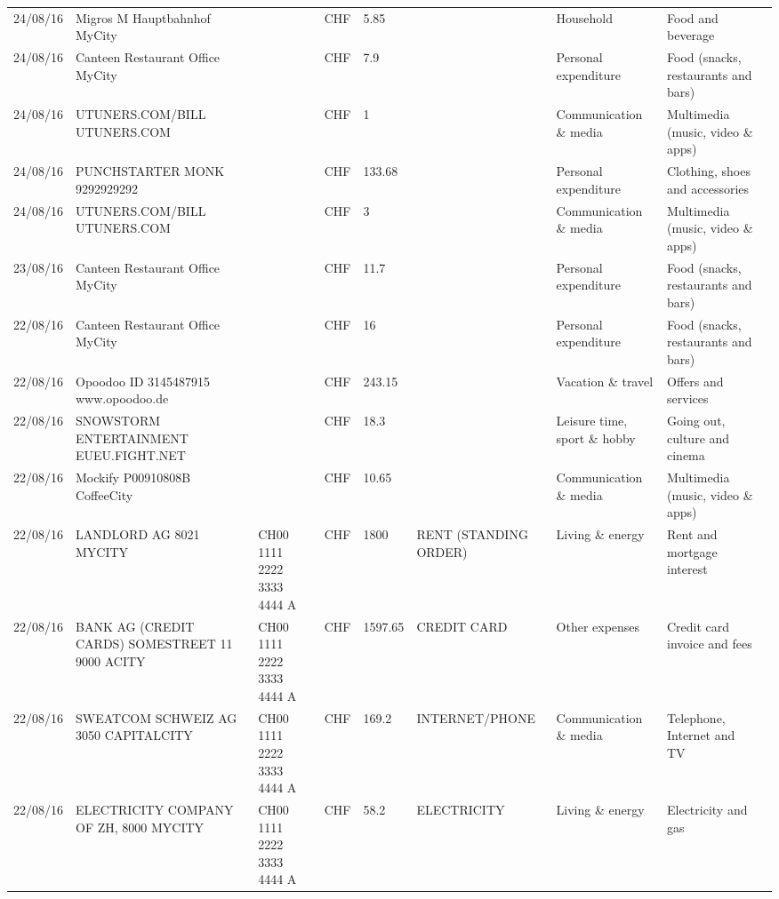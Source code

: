 \begin{landscape}
\begin{tiny}
\begin{longtable}{lp{4cm}llllp{3cm}ll}
		    24/08/16 & Migros M Hauptbahnhof    MyCity &       & CHF   & 5.85  &       & Household & Food and beverage \\
		    24/08/16 & Canteen Restaurant Office      MyCity &       & CHF   & 7.9   &       & Personal expenditure & Food (snacks, restaurants and bars) \\
		    24/08/16 & UTUNERS.COM/BILL          UTUNERS.COM &       & CHF   & 1     &       & Communication \& media & Multimedia (music, video \& apps) \\
		    24/08/16 & PUNCHSTARTER MONK   9292929292 &       & CHF   & 133.68 &       & Personal expenditure & Clothing, shoes and accessories \\
		    24/08/16 & UTUNERS.COM/BILL          UTUNERS.COM &       & CHF   & 3     &       & Communication \& media & Multimedia (music, video \& apps) \\
		    23/08/16 & Canteen Restaurant Office      MyCity &       & CHF   & 11.7  &       & Personal expenditure & Food (snacks, restaurants and bars) \\
		    22/08/16 & Canteen Restaurant Office      MyCity &       & CHF   & 16    &       & Personal expenditure & Food (snacks, restaurants and bars) \\
		    22/08/16 & Opoodoo ID 3145487915      www.opoodoo.de &       & CHF   & 243.15 &       & Vacation \& travel & Offers and services \\
		    22/08/16 & SNOWSTORM ENTERTAINMENT EUEU.FIGHT.NET &       & CHF   & 18.3  &       & Leisure time, sport \& hobby & Going out, culture and cinema \\
		    22/08/16 & Mockify P00910808B       CoffeeCity &       & CHF   & 10.65 &       & Communication \& media & Multimedia (music, video \& apps) \\
		    22/08/16 & LANDLORD AG 8021 MYCITY & CH00 1111 2222 3333 4444 A & CHF   & 1800  & RENT (STANDING ORDER) & Living \& energy & Rent and mortgage interest \\
		    22/08/16 & BANK AG (CREDIT CARDS) SOMESTREET 11 9000 ACITY & CH00 1111 2222 3333 4444 A & CHF   & 1597.65 & CREDIT CARD & Other expenses & Credit card invoice and fees \\
		    22/08/16 & SWEATCOM SCHWEIZ AG 3050 CAPITALCITY & CH00 1111 2222 3333 4444 A & CHF   & 169.2 & INTERNET/PHONE & Communication \& media & Telephone,  Internet and TV \\
		    22/08/16 & ELECTRICITY COMPANY OF ZH, 8000 MYCITY & CH00 1111 2222 3333 4444 A & CHF   & 58.2  & ELECTRICITY & Living \& energy & Electricity and gas \\

\end{longtable}
\end{tiny}
\end{landscape}
